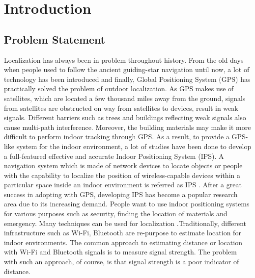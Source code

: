 \documentclass[\main/thesis.tex]{subfiles}
\begin{document}
\graphicspath{{img/}{01_intro/img/}}

\chapter{Introduction}

\section{Problem Statement}
Localization has always been in problem throughout history. From the old days when people used to follow the ancient guiding-star navigation until now, a lot of technology has been introduced and finally, Global Positioning System (GPS) has practically solved the problem of outdoor localization. As GPS makes use of satellites, which are located a few thousand miles away from the ground, signals from satellites are obstructed on way from satellites to devices, result in weak signals. Different barriers such as trees and buildings reflecting weak signals also cause multi-path interference. Moreover, the building materials may make it more difficult to perform indoor tracking through GPS. As a result, to provide a GPS-like system for the indoor environment, a lot of studies have been done to develop a full-featured effective and accurate Indoor Positioning System (IPS).
\newline\newline
A navigation system which is made of network devices to locate objects or people with the capability to localize the position of wireless-capable devices within a particular space inside an indoor environment is referred as IPS \cite{survey_on_indoor_wireless_positioning_techniques}. After a great success in adopting with GPS, developing IPS has become a popular research area due to its increasing demand. People want to use indoor positioning systems for various purposes such as security, finding the location of materials and emergency. 
\newline\newline
Many techniques can be used for localization \cite{a_survey_on_localization_for_mobile_wireless_sensor_networks}.Traditionally, different infrastructure such as Wi-Fi, Bluetooth are re-purpose to estimate location for indoor environments. The common approach to estimating distance or location with Wi-Fi and Bluetooth signals is to measure signal strength. The problem with such an approach, of course, is that signal strength is a poor indicator of distance.
\newline\newline
\end{document}
